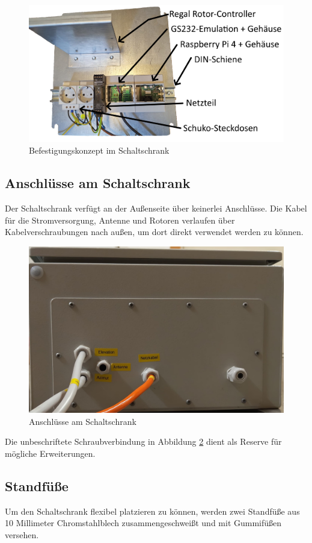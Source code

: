 \begin{figure}[H]
	\centering
	\includegraphics[width=0.7\linewidth]{../ref/Schaltschrank_Befestigung.jpg}
	\caption{Befestigungskonzept im Schaltschrank}
	\label{fig:schaltschrankbefestigung}
\end{figure}

\subsection{Anschlüsse am Schaltschrank}
Der Schaltschrank verfügt an der Außenseite über keinerlei Anschlüsse. Die Kabel für die Stromversorgung, Antenne und Rotoren verlaufen über Kabelverschraubungen nach außen, um dort direkt verwendet werden zu können. 

\begin{figure}[H]
	\centering
	\includegraphics[width=0.7\linewidth]{../ref/Schaltschrank_Anschluss.jpeg}
	\caption{Anschlüsse am Schaltschrank}
	\label{fig:schaltschrankanschluesse}
\end{figure}

Die unbeschriftete Schraubverbindung in Abbildung \ref{fig:schaltschrankanschluesse} dient als Reserve für mögliche Erweiterungen.

\subsection{Standfüße}
Um den Schaltschrank flexibel platzieren zu können, werden zwei Standfüße aus 10 Millimeter Chromstahlblech zusammengeschweißt und mit Gummifüßen versehen. 

